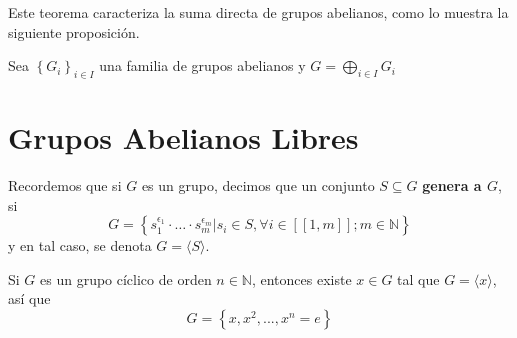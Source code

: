\documentclass[12pt]{report}
\theoremstyle{largebreak}
\newcommand\natint[1]{\ensuremath{\left[\!\left[ #1\right]\!\right]}}
\begin{document}
    Este teorema caracteriza la suma directa de grupos abelianos, como lo muestra la siguiente proposición.

    \begin{propo}
        Sea $\left\{G_i \right\}_{ i\in I}$ una familia de grupos abelianos y $G=\bigoplus_{ i\in I}G_i$ 
    \end{propo}

    \section{Grupos Abelianos Libres}

    Recordemos que si $G$ es un grupo, decimos que un conjunto $S\subseteq G$ \textbf{genera a $G$}, si
    \begin{equation*}
        G=\left\{s_1^{\epsilon_1}\cdot\dots\cdot s_m^{\epsilon_m}\Big|s_i\in S,\forall i\in\natint{1,m}; m\in\mathbb{N} \right\}
    \end{equation*}
    y en tal caso, se denota $G=\langle S\rangle$. 

    \begin{exa}
        Si $G$ es un grupo cíclico de orden $n\in\mathbb{N}$, entonces existe $x\in G$ tal que $G=\langle x\rangle$, así que
        \begin{equation*}
            G=\left\{x,x^2,...,x^n=e\right\}
        \end{equation*}
    \end{exa}
\end{document}

